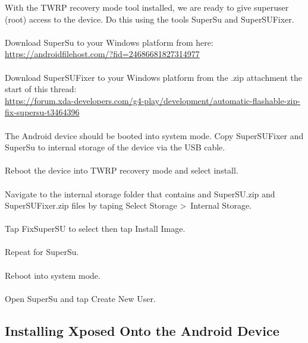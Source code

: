 With the TWRP recovery mode tool installed, we are ready to give superuser (root) access to the device.  Do this using the tools SuperSu and SuperSUFixer.\\
\\
Download SuperSu to your Windows platform from here:\\
\url{https://androidfilehost.com/?fid=24686681827314977}\\
\\
Download SuperSUFixer to your Windows platform from the .zip attachment the start of this thread:\\
\url{https://forum.xda-developers.com/g4-play/development/automatic-flashable-zip-fix-supersu-t3464396}\\
\\
The Android device should be booted into system mode.  Copy SuperSUFixer and SuperSu to internal storage of the device via the USB cable.\\
\\
Reboot the device into TWRP recovery mode and select install.\\
\\
Navigate to the internal storage folder that contains and SuperSU.zip and SuperSUFixer.zip files by taping Select Storage \textgreater\ Internal Storage.\\
\\
Tap FixSuperSU to select then tap Install Image.\\
\\
Repeat for SuperSu.\\
\\
Reboot into system mode.\\
\\
Open SuperSu and tap Create New User.

\subsection{Installing Xposed Onto the Android Device}
\label{sec:Installing Xposed onto the Android Device}

